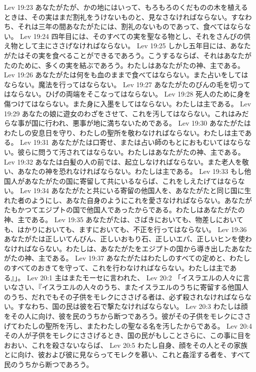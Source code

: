 Lev 19:23  あなたがたが、かの地にはいって、もろもろのくだものの木を植えるときは、その実はまだ割礼をうけないものと、見なさなければならない。すなわち、それは三年の間あなたがたには、割礼のないものであって、食べてはならない。
Lev 19:24  四年目には、そのすべての実を聖なる物とし、それをさんびの供え物として主にささげなければならない。
Lev 19:25  しかし五年目には、あなたがたはその実を食べることができるであろう。こうするならば、それはあなたがたのために、多くの実を結ぶであろう。わたしはあなたがたの神、主である。
Lev 19:26  あなたがたは何をも血のままで食べてはならない。また占いをしてはならない。魔法を行ってはならない。
Lev 19:27  あなたがたのびんの毛を切ってはならない。ひげの両端をそこなってはならない。
Lev 19:28  死人のために身を傷つけてはならない。また身に入墨をしてはならない。わたしは主である。
Lev 19:29  あなたの娘に遊女のわざをさせて、これを汚してはならない。これはみだらな事が国に行われ、悪事が地に満ちないためである。
Lev 19:30  あなたがたはわたしの安息日を守り、わたしの聖所を敬わなければならない。わたしは主である。
Lev 19:31  あなたがたは口寄せ、または占い師のもとにおもむいてはならない。彼らに問うて汚されてはならない。わたしはあなたがたの神、主である。
Lev 19:32  あなたは白髪の人の前では、起立しなければならない。また老人を敬い、あなたの神を恐れなければならない。わたしは主である。
Lev 19:33  もし他国人があなたがたの国に寄留して共にいるならば、これをしえたげてはならない。
Lev 19:34  あなたがたと共にいる寄留の他国人を、あなたがたと同じ国に生れた者のようにし、あなた自身のようにこれを愛さなければならない。あなたがたもかつてエジプトの国で他国人であったからである。わたしはあなたがたの神、主である。
Lev 19:35  あなたがたは、さばきにおいても、物差しにおいても、はかりにおいても、ますにおいても、不正を行ってはならない。
Lev 19:36  あなたがたは正しいてんびん、正しいおもり石、正しいエパ、正しいヒンを使わなければならない。わたしは、あなたがたをエジプトの国から導き出したあなたがたの神、主である。
Lev 19:37  あなたがたはわたしのすべての定めと、わたしのすべてのおきてを守って、これを行わなければならない。わたしは主である』」。
Lev 20:1  主はまたモーセに言われた、
Lev 20:2  「イスラエルの人々に言いなさい、『イスラエルの人々のうち、またイスラエルのうちに寄留する他国人のうち、だれでもその子供をモレクにささげる者は、必ず殺されなければならない。すなわち、国の民は彼を石で撃たなければならない。
Lev 20:3  わたしは顔をその人に向け、彼を民のうちから断つであろう。彼がその子供をモレクにささげてわたしの聖所を汚し、またわたしの聖なる名を汚したからである。
Lev 20:4  その人が子供をモレクにささげるとき、国の民がもしことさらに、この事に目をおおい、これを殺さないならば、
Lev 20:5  わたし自身、顔をその人とその家族とに向け、彼および彼に見ならってモレクを慕い、これと姦淫する者を、すべて民のうちから断つであろう。
